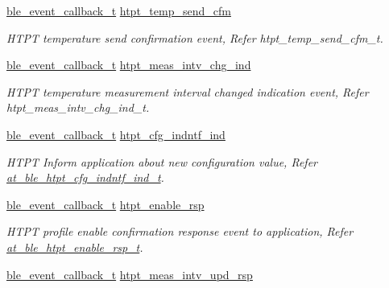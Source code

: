 \begin{DoxyCompactItemize}
\mbox{\hyperlink{ble__manager_8h_a04ce4bb8cb8282f2762e3924b1773cc9}{ble\+\_\+event\+\_\+callback\+\_\+t}} \mbox{\hyperlink{structble__htpt__event__cb_aa135bc9fb13a0697380ccbfcfb42c0b9}{htpt\+\_\+temp\+\_\+send\+\_\+cfm}}
\begin{DoxyCompactList}\small\item\em H\+T\+PT temperature send confirmation event, Refer htpt\+\_\+temp\+\_\+send\+\_\+cfm\+\_\+t. \end{DoxyCompactList}\item 
\mbox{\hyperlink{ble__manager_8h_a04ce4bb8cb8282f2762e3924b1773cc9}{ble\+\_\+event\+\_\+callback\+\_\+t}} \mbox{\hyperlink{structble__htpt__event__cb_a9366e383df70598018d1a3c427cb7449}{htpt\+\_\+meas\+\_\+intv\+\_\+chg\+\_\+ind}}
\begin{DoxyCompactList}\small\item\em H\+T\+PT temperature measurement interval changed indication event, Refer htpt\+\_\+meas\+\_\+intv\+\_\+chg\+\_\+ind\+\_\+t. \end{DoxyCompactList}\item 
\mbox{\hyperlink{ble__manager_8h_a04ce4bb8cb8282f2762e3924b1773cc9}{ble\+\_\+event\+\_\+callback\+\_\+t}} \mbox{\hyperlink{structble__htpt__event__cb_a0fe32b260da73923ae2cb8076c4d7ccf}{htpt\+\_\+cfg\+\_\+indntf\+\_\+ind}}
\begin{DoxyCompactList}\small\item\em H\+T\+PT Inform application about new configuration value, Refer \mbox{\hyperlink{structat__ble__htpt__cfg__indntf__ind__t}{at\+\_\+ble\+\_\+htpt\+\_\+cfg\+\_\+indntf\+\_\+ind\+\_\+t}}. \end{DoxyCompactList}\item 
\mbox{\hyperlink{ble__manager_8h_a04ce4bb8cb8282f2762e3924b1773cc9}{ble\+\_\+event\+\_\+callback\+\_\+t}} \mbox{\hyperlink{structble__htpt__event__cb_a6e32bf8302f73cc42020beb79a624d3a}{htpt\+\_\+enable\+\_\+rsp}}
\begin{DoxyCompactList}\small\item\em H\+T\+PT profile enable confirmation response event to application, Refer \mbox{\hyperlink{structat__ble__htpt__enable__rsp__t}{at\+\_\+ble\+\_\+htpt\+\_\+enable\+\_\+rsp\+\_\+t}}. \end{DoxyCompactList}\item 
\mbox{\hyperlink{ble__manager_8h_a04ce4bb8cb8282f2762e3924b1773cc9}{ble\+\_\+event\+\_\+callback\+\_\+t}} \mbox{\hyperlink{structble__htpt__event__cb_a28e05ac5664ac4de693b9a1e22c9c011}{htpt\+\_\+meas\+\_\+intv\+\_\+upd\+\_\+rsp}}

\end{DoxyCompactItemize}
